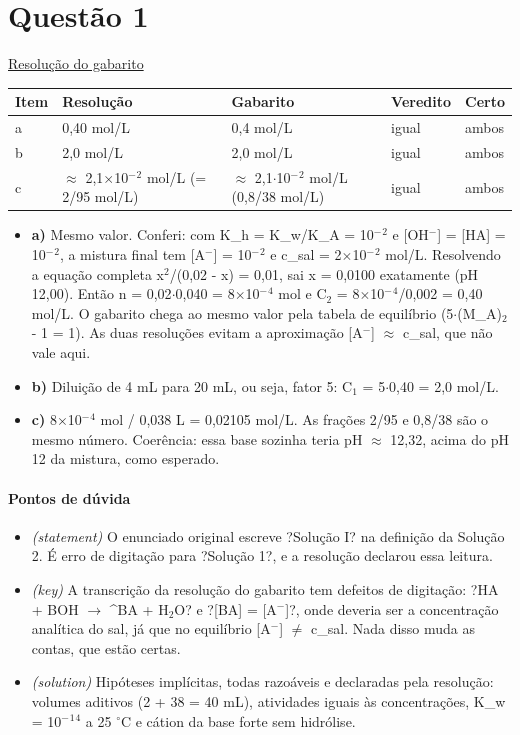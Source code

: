 \documentclass{article}%
\begin{document}
\section*{Questão 1}%
\href{https://poliedroresolve.sistemapoliedro.com.br/vestibulares/ita/2026/ita-2-fase-dia-2-29-10-2025-2-fase-dia-2/dissertativa-1-quimica-2-fase-dia-2-ita-2026}{Resolução do gabarito}\par\smallskip%
\begin{longtable}{@{}p{} p{} p{} p{} p{}@{}}\toprule Item & Resolução & Gabarito & Veredito & Certo \\ \midrule
a & 0,40 mol/L & 0,4 mol/L & igual & ambos \\
b & 2,0 mol/L & 2,0 mol/L & igual & ambos \\
c & $\approx$ 2,1$\times$10$^{-}$$^2$ mol/L (= 2/95 mol/L) & $\approx$ 2,1$\cdot$10$^{-}$$^2$ mol/L (0,8/38 mol/L) & igual & ambos \\
\bottomrule\end{longtable}%
\begin{itemize}%
\item%
\textbf{a)} Mesmo valor. Conferi: com K\_h = K\_w/K\_A = 10$^{-}$$^2$ e {[}OH$^{-}${]} = {[}HA{]} = 10$^{-}$$^2$, a mistura final tem {[}A$^{-}${]} = 10$^{-}$$^2$ e c\_sal = 2$\times$10$^{-}$$^2$ mol/L. Resolvendo a equação completa x$^2$/(0,02 - x) = 0,01, sai x = 0,0100 exatamente (pH 12,00). Então n = 0,02$\cdot$0,040 = 8$\times$10$^{-}$$^{4}$ mol e C$_{2}$ = 8$\times$10$^{-}$$^{4}$/0,002 = 0,40 mol/L. O gabarito chega ao mesmo valor pela tabela de equilíbrio (5$\cdot$(M\_A)$_{2}$ - 1 = 1). As duas resoluções evitam a aproximação {[}A$^{-}${]} $\approx$ c\_sal, que não vale aqui.%
\item%
\textbf{b)} Diluição de 4 mL para 20 mL, ou seja, fator 5: C$_{1}$ = 5$\cdot$0,40 = 2,0 mol/L.%
\item%
\textbf{c)} 8$\times$10$^{-}$$^{4}$ mol / 0,038 L = 0,02105 mol/L. As frações 2/95 e 0,8/38 são o mesmo número. Coerência: essa base sozinha teria pH $\approx$ 12,32, acima do pH 12 da mistura, como esperado.%
\end{itemize}%
\paragraph{Pontos de dúvida}%
\begin{itemize}%
\item%
\textit{(statement)} O enunciado original escreve ?Solução I? na definição da Solução 2. É erro de digitação para ?Solução 1?, e a resolução declarou essa leitura.%
\item%
\textit{(key)} A transcrição da resolução do gabarito tem defeitos de digitação: ?HA + BOH $\to$ \^{}BA + H$_{2}$O? e ?{[}BA{]} = {[}A$^{-}${]}?, onde deveria ser a concentração analítica do sal, já que no equilíbrio {[}A$^{-}${]} $\neq$ c\_sal. Nada disso muda as contas, que estão certas.%
\item%
\textit{(solution)} Hipóteses implícitas, todas razoáveis e declaradas pela resolução: volumes aditivos (2 + 38 = 40 mL), atividades iguais às concentrações, K\_w = 10$^{-}$$^{1}$$^{4}$ a 25 $^\circ$C e cátion da base forte sem hidrólise.%
\end{itemize}%
\end{document}

